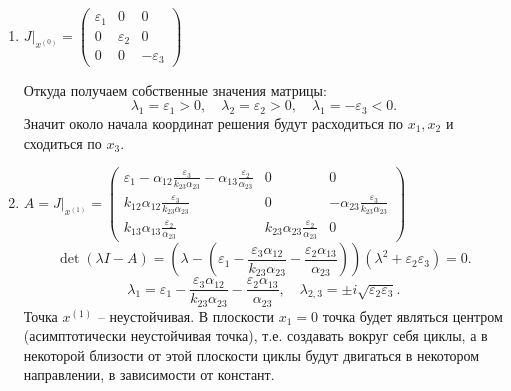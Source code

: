     \begin{enumerate}
        \item \(
            J \big|_{x^{(0)}} = \left(\begin{matrix}
                \varepsilon_1 & 0 & 0 \\
                0 & \varepsilon_2 & 0 \\
                0 & 0  & -\varepsilon_3
            \end{matrix}\right)
        \)

        Откуда получаем собственные значения матрицы: 
        \[
            \lambda_1 = \varepsilon_1 > 0, \quad \lambda_2 = \varepsilon_2 > 0, \quad \lambda_1 = -\varepsilon_3 < 0.
        \]
        Значит около начала координат решения будут расходиться по \( x_1, x_2 \) и сходиться по \( x_3 \).

        \item \(
            A = J \big|_{x^{(1)}} = \left(\begin{matrix}
                \varepsilon_1 - \alpha_{12} \frac{\varepsilon_3}{k_{23} \alpha_{23}} - \alpha_{13} \frac{\varepsilon_2}{\alpha_{23}} & 0 & 0 \\[10pt]
                k_{12} \alpha_{12} \frac{\varepsilon_3}{k_{23} \alpha_{23}} & 0 & -\alpha_{23} \frac{\varepsilon_3}{k_{23} \alpha_{23}} \\[10pt]
                k_{13} \alpha_{13} \frac{\varepsilon_2}{\alpha_{23}} & k_{23} \alpha_{23} \frac{\varepsilon_2}{\alpha_{23}}  & 0
            \end{matrix}\right)
        \)
        \[
            \det(\lambda I - A) = \left(\lambda - \left(\varepsilon_1 - \frac{\varepsilon_3 \alpha_{12} }{k_{23} \alpha_{23}} - \frac{\varepsilon_2 \alpha_{13}}{\alpha_{23}} \right) \right)(\lambda^2 + \varepsilon_2 \varepsilon_3) = 0.
        \]
        \[
            \lambda_1 = \varepsilon_1 - \frac{\varepsilon_3 \alpha_{12} }{k_{23} \alpha_{23}} - \frac{\varepsilon_2 \alpha_{13}}{\alpha_{23}} , \quad \lambda_{2,3} = \pm i \sqrt{\varepsilon_2 \varepsilon_3}.
        \]
        Точка \( x^{(1)} \) -- неустойчивая. В плоскости \( x_1 = 0 \) точка будет являться центром (асимптотически неустойчивая точка), т.е. создавать вокруг себя циклы, а в некоторой близости от этой плоскости циклы будут двигаться в некотором направлении, в зависимости от констант.


\end{enumerate}
